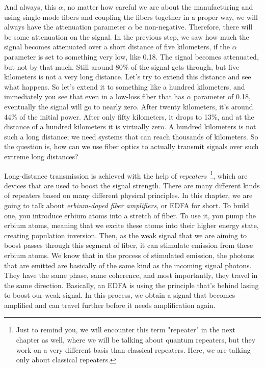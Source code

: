 And always, this $\alpha$, no matter how careful we are about the manufacturing and using single-mode fibers and coupling the fibers together in a proper way, we will always have the attenuation parameter $\alpha$ be non-negative. Therefore, there will be some attenuation on the signal. In the previous step, we saw how much the signal becomes attenuated over a short distance of five kilometers, if the $\alpha$ parameter is set to something very low, like 0.18. The signal becomes attenuated, but not by that much. Still around 80\% of the signal gets through, but five kilometers is not a very long distance. Let's try to extend this distance and see what happens. So let's extend it to something like a hundred kilometers, and immediately you see that even in a low-loss fiber that has $\alpha$ parameter of 0.18, eventually the signal will go to nearly zero. After twenty kilometers, it's around 44\% of the initial power. After only fifty kilometers, it drops to 13\%, and at the distance of a hundred kilometers it is virtually zero. A hundred kilometers is not such a long distance; we need systems that can reach thousands of kilometers. So the question is, how can we use fiber optics to actually transmit signals over such extreme long distances?

Long-distance transmission is achieved with the help of \emph{repeaters}~\footnote{Just to remind you, we will encounter this term "repeater" in the next chapter as well, where we will be talking about quantum repeaters, but they work on a very different basis than classical repeaters. Here, we are talking only about classical repeaters.}, which are devices that are used to boost the signal strength. There are many different kinds of repeaters based on many different physical principles. In this chapter, we are going to talk about \emph{erbium-doped fiber amplifiers}, or EDFA for short. To build one, you introduce erbium atoms into a stretch of fiber. To use it, you pump the erbium atoms, meaning that we excite these atoms into their higher energy state, creating population inversion. Then, as the weak signal that we are aiming to boost passes through this segment of fiber, it can stimulate emission from these erbium atoms. We know that in the process of stimulated emission, the photons that are emitted are basically of the same kind as the incoming signal photons. They have the same phase, same coherence, and most importantly, they travel in the same direction. Basically, an EDFA is using the principle that's behind lasing to boost our weak signal. In this process, we obtain a signal that becomes amplified and can travel further before it needs amplification again.

